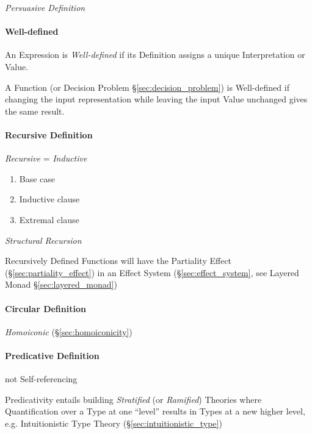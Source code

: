 \emph{Persuasive Definition}



\paragraph{Well-defined}\label{sec:well_defined}\hfill

An Expression is \emph{Well-defined} if its Definition assigns a
unique Interpretation or Value.

A Function (or Decision Problem \S\ref{sec:decision_problem}) is
Well-defined if changing the input representation while leaving the
input Value unchanged gives the same result. %



\paragraph{Recursive Definition}\label{sec:recursive_definition}\hfill

\emph{Recursive} = \emph{Inductive}

\begin{enumerate}
    \item Base case
    \item Inductive clause
    \item Extremal clause
\end{enumerate}

\emph{Structural Recursion}

Recursively Defined Functions will have the Partiality Effect
(\S\ref{sec:partiality_effect}) in an Effect System
(\S\ref{sec:effect_system}, see Layered Monad
\S\ref{sec:layered_monad})



\paragraph{Circular Definition}\label{sec:circular_definition}\hfill

\emph{Homoiconic} (\S\ref{sec:homoiconicity})



\paragraph{Predicative Definition}\label{sec:predicative_definition}\hfill

not Self-referencing

Predicativity entails building \emph{Stratified} (or \emph{Ramified}) Theories
where Quantification over a Type at one ``level'' results in Types at a new
higher level, e.g. Intuitionistic Type Theory (\S\ref{sec:intuitionistic_type})

